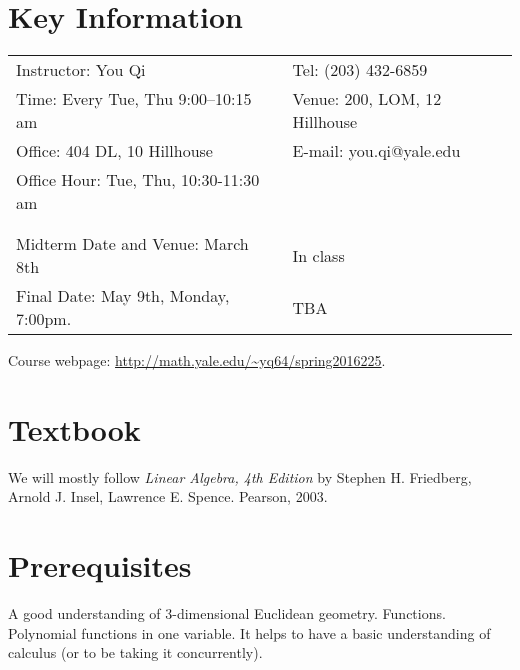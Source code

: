 \documentclass[margin,line]{res}
\begin{document}

\begin{resume}

\section{\sc Key Information}
\vspace{.05in}
\begin{tabular}{@{}p{3.4in}p{4in}}
 Instructor: You Qi            & Tel: (203) 432-6859   \\
Time: Every Tue, Thu 9:00--10:15 am & Venue: 200, LOM, 12 Hillhouse\\
Office: 404 DL, 10 Hillhouse   & E-mail:  you.qi@yale.edu \\
Office Hour: Tue, Thu, 10:30-11:30 am &\\
& \\
& \\
Midterm Date and Venue: March 8th & In class\\
Final Date: May 9th, Monday, 7:00pm. & TBA
\end{tabular}
Course webpage: \url{http://math.yale.edu/~yq64/spring2016225}.

\section{\sc Textbook}
We will mostly follow \emph{Linear Algebra, 4th Edition}
by Stephen H. Friedberg, Arnold J. Insel, Lawrence E. Spence. Pearson, 2003.

\section{\sc Prerequisites}
A good understanding of 3-dimensional Euclidean geometry. Functions. Polynomial functions in one variable. It helps to have a basic understanding of calculus (or to be taking it concurrently).



\end{resume}
\end{document}
